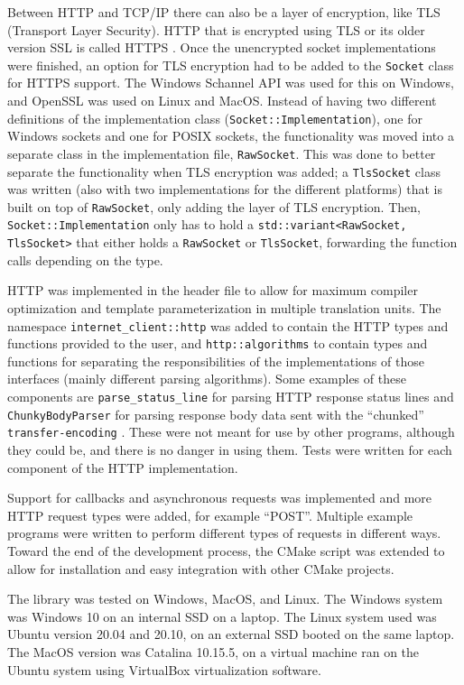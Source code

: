 \documentclass[12pt, a4paper]{article}
\begin{document}
Between HTTP and TCP/IP there can also be a layer of encryption, like TLS (Transport Layer Security). HTTP that is encrypted using TLS or its older version SSL is called HTTPS \parencite{HttpsGlossary}. Once the unencrypted socket implementations were finished, an option for TLS encryption had to be added to the \texttt{Socket} class for HTTPS support. The Windows Schannel API was used for this on Windows, and OpenSSL was used on Linux and MacOS. Instead of having two different definitions of the implementation class (\texttt{Socket::Implementation}), one for Windows sockets and one for POSIX sockets, the functionality was moved into a separate class in the implementation file, \texttt{RawSocket}. This was done to better separate the functionality when TLS encryption was added; a \texttt{TlsSocket} class was written (also with two implementations for the different platforms) that is built on top of \texttt{RawSocket}, only adding the layer of TLS encryption. Then, \texttt{Socket::Implementation} only has to hold a \texttt{std::variant<RawSocket, TlsSocket>} that either holds a \texttt{RawSocket} or \texttt{TlsSocket}, forwarding the function calls depending on the type.

HTTP was implemented in the header file to allow for maximum compiler optimization and template parameterization in multiple translation units. The namespace \texttt{internet\_client::http} was added to contain the HTTP types and functions provided to the user, and \texttt{http::algorithms} to contain types and functions for separating the responsibilities of the implementations of those interfaces (mainly different parsing algorithms). Some examples of these components are \texttt{parse\_status\_line} for parsing HTTP response status lines and \texttt{ChunkyBodyParser} for parsing response body data sent with the “chunked” \texttt{transfer-encoding} \parencite{HttpTransferEncoding}. These were not meant for use by other programs, although they could be, and there is no danger in using them. Tests were written for each component of the HTTP implementation.

Support for callbacks and asynchronous requests was implemented and more HTTP request types were added, for example “POST”. Multiple example programs were written to perform different types of requests in different ways. Toward the end of the development process, the CMake script was extended to allow for installation and easy integration with other CMake projects.

The library was tested on Windows, MacOS, and Linux. The Windows system was Windows 10 on an internal SSD on a laptop. The Linux system used was Ubuntu version 20.04 and 20.10, on an external SSD booted on the same laptop. The MacOS version was Catalina 10.15.5, on a virtual machine ran on the Ubuntu system using VirtualBox virtualization software.
\end{document}
